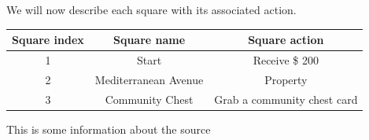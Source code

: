 \documentclass{article}
\begin{document}
We will now describe each square with its associated action.
\begin{center} 
\begin{tabular}{|c|c|c|}
\hline
\textbf{Square index} & \textbf{Square name} & \textbf{Square action}\\
\hline 
1 & Start & Receive \$ 200\\
\hline
2 & Mediterranean Avenue & Property\\
\hline
3 & Community Chest & Grab a community chest card\\
\end{tabular}
\end{center}
\begin{thebibliography}{9}
 This is some information about the source
\end{thebibliography}
\end{document}
